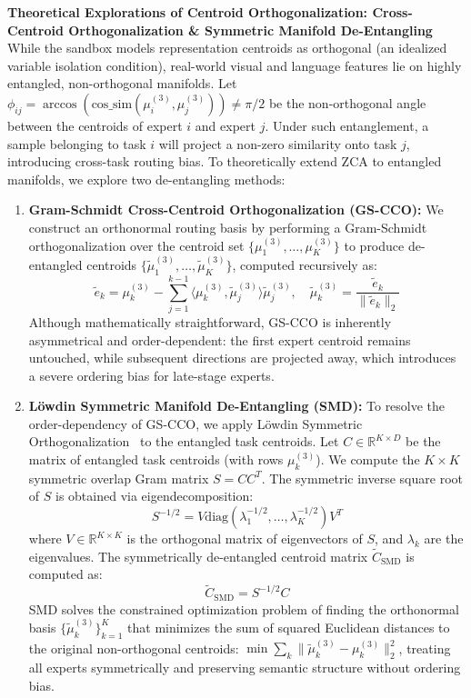 \textbf{Theoretical Explorations of Centroid Orthogonalization: Cross-Centroid Orthogonalization \& Symmetric Manifold De-Entangling}
While the sandbox models representation centroids as orthogonal (an idealized variable isolation condition), real-world visual and language features lie on highly entangled, non-orthogonal manifolds. Let $\phi_{ij} = \arccos(\text{cos\_sim}(\mu^{(3)}_i, \mu^{(3)}_j)) \neq \pi/2$ be the non-orthogonal angle between the centroids of expert $i$ and expert $j$. Under such entanglement, a sample belonging to task $i$ will project a non-zero similarity onto task $j$, introducing cross-task routing bias. To theoretically extend ZCA to entangled manifolds, we explore two de-entangling methods:
\begin{enumerate}
  \item \textbf{Gram-Schmidt Cross-Centroid Orthogonalization (GS-CCO):} We construct an orthonormal routing basis by performing a Gram-Schmidt orthogonalization over the centroid set $\{\mu^{(3)}_1, \dots, \mu^{(3)}_K\}$ to produce de-entangled centroids $\{\tilde{\mu}^{(3)}_1, \dots, \tilde{\mu}^{(3)}_K\}$, computed recursively as:
  \begin{equation}
    \tilde{e}_k = \mu^{(3)}_k - \sum_{j=1}^{k-1} \langle \mu^{(3)}_k, \tilde{\mu}^{(3)}_j \rangle \tilde{\mu}^{(3)}_j, \quad \tilde{\mu}^{(3)}_k = \frac{\tilde{e}_k}{\|\tilde{e}_k\|_2}
  \end{equation}
  Although mathematically straightforward, GS-CCO is inherently asymmetrical and order-dependent: the first expert centroid remains untouched, while subsequent directions are projected away, which introduces a severe ordering bias for late-stage experts.
  
  \item \textbf{L{\"o}wdin Symmetric Manifold De-Entangling (SMD):} To resolve the order-dependency of GS-CCO, we apply L{\"o}wdin Symmetric Orthogonalization~\cite{lowdin1950non} to the entangled task centroids. Let $C \in \mathbb{R}^{K \times D}$ be the matrix of entangled task centroids (with rows $\mu^{(3)}_k$). We compute the $K \times K$ symmetric overlap Gram matrix $S = C C^T$. The symmetric inverse square root of $S$ is obtained via eigendecomposition:
  \begin{equation}
    S^{-1/2} = V \text{diag}(\lambda_1^{-1/2}, \dots, \lambda_K^{-1/2}) V^T
  \end{equation}
  where $V \in \mathbb{R}^{K \times K}$ is the orthogonal matrix of eigenvectors of $S$, and $\lambda_k$ are the eigenvalues. The symmetrically de-entangled centroid matrix $\tilde{C}_{\text{SMD}}$ is computed as:
  \begin{equation}
    \tilde{C}_{\text{SMD}} = S^{-1/2} C
  \end{equation}
  SMD solves the constrained optimization problem of finding the orthonormal basis $\{\tilde{\mu}^{(3)}_k\}_{k=1}^K$ that minimizes the sum of squared Euclidean distances to the original non-orthogonal centroids: $\min \sum_k \|\tilde{\mu}^{(3)}_k - \mu^{(3)}_k\|_2^2$, treating all experts symmetrically and preserving semantic structure without ordering bias.
\end{enumerate}

